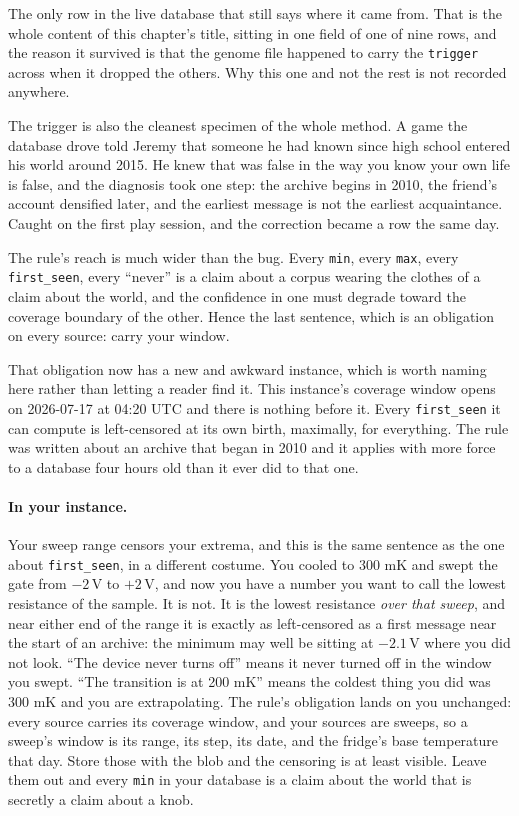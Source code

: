The only row in the live database that still says where it came from. That is the whole content of this chapter's title, sitting in one field of one of nine rows, and the reason it survived is that the genome file happened to carry the \texttt{trigger} across when it dropped the others. Why this one and not the rest is not recorded anywhere.

The trigger is also the cleanest specimen of the whole method. A game the database drove told Jeremy that someone he had known since high school entered his world around 2015. He knew that was false in the way you know your own life is false, and the diagnosis took one step: the archive begins in 2010, the friend's account densified later, and the earliest message is not the earliest acquaintance. Caught on the first play session, and the correction became a row the same day.

The rule's reach is much wider than the bug. Every \texttt{min}, every \texttt{max}, every \texttt{first\_seen}, every ``never'' is a claim about a corpus wearing the clothes of a claim about the world, and the confidence in one must degrade toward the coverage boundary of the other. Hence the last sentence, which is an obligation on every source: carry your window.

That obligation now has a new and awkward instance, which is worth naming here rather than letting a reader find it. This instance's coverage window opens on 2026-07-17 at 04:20 UTC and there is nothing before it. Every \texttt{first\_seen} it can compute is left-censored at its own birth, maximally, for everything. The rule was written about an archive that began in 2010 and it applies with more force to a database four hours old than it ever did to that one.

\paragraph{In your instance.} Your sweep range censors your extrema, and this is the same sentence as the one about \texttt{first\_seen}, in a different costume. You cooled to 300 mK and swept the gate from $-2$\,V to $+2$\,V, and now you have a number you want to call the lowest resistance of the sample. It is not. It is the lowest resistance \emph{over that sweep}, and near either end of the range it is exactly as left-censored as a first message near the start of an archive: the minimum may well be sitting at $-2.1$\,V where you did not look. ``The device never turns off'' means it never turned off in the window you swept. ``The transition is at 200 mK'' means the coldest thing you did was 300 mK and you are extrapolating. The rule's obligation lands on you unchanged: every source carries its coverage window, and your sources are sweeps, so a sweep's window is its range, its step, its date, and the fridge's base temperature that day. Store those with the blob and the censoring is at least visible. Leave them out and every \texttt{min} in your database is a claim about the world that is secretly a claim about a knob.

